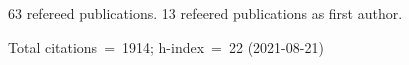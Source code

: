 63 refereed publications. 13 refeered publications as first author.

Total citations~=~1914; h-index~=~22 (2021-08-21)